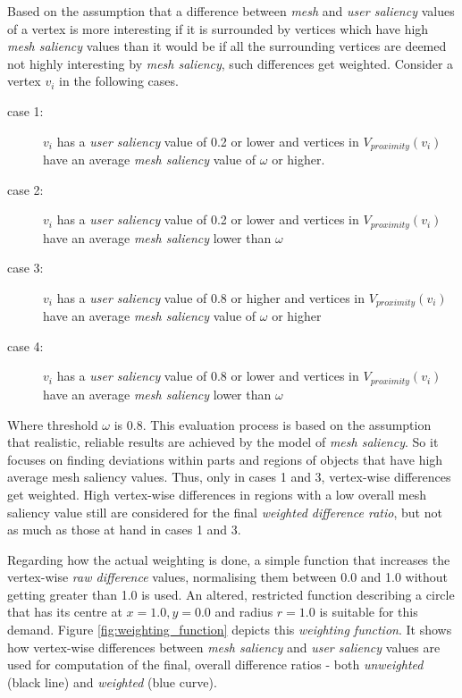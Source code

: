 Based on the assumption that a difference between \textit{mesh} and \textit{user saliency} values of a vertex is more interesting if it is surrounded by vertices which have high \textit{mesh saliency} values than it would be if all the surrounding vertices are deemed not highly interesting by \textit{mesh saliency}, such differences get weighted. Consider a vertex $v_i$ in the following cases.

\begin{description}
	\item [case 1:] $v_i$ has a \textit{user saliency} value of 0.2 or lower and vertices in $V_{proximity}(v_i)$ have an average \textit{mesh saliency} value of $\omega$ or higher.
	\item [case 2:] $v_i$ has a \textit{user saliency} value of 0.2 or lower and vertices in $V_{proximity}(v_i)$ have an average \textit{mesh saliency} lower than $\omega$
	\item [case 3:] $v_i$ has a \textit{user saliency} value of 0.8 or higher and vertices in $V_{proximity}(v_i)$ have an average \textit{mesh saliency} value of $\omega$ or higher
	\item [case 4:] $v_i$ has a \textit{user saliency} value of 0.8 or lower and vertices in $V_{proximity}(v_i)$ have an average \textit{mesh saliency} lower than $\omega$
\end{description}

Where threshold $\omega$ is 0.8. This evaluation process is based on the assumption that realistic, reliable results are achieved by the model of \textit{mesh saliency}. So it focuses on finding deviations within parts and regions of objects that have high average mesh saliency values. Thus, only in cases 1 and 3, vertex-wise differences get weighted. High vertex-wise differences in regions with a low overall mesh saliency value still are considered for the final \textit{weighted difference ratio}, but not as much as those at hand in cases 1 and 3.

Regarding how the actual weighting is done, a simple function that increases the vertex-wise \textit{raw difference} values, normalising them between 0.0 and 1.0 without getting greater than 1.0 is used. An altered, restricted function describing a circle that has its centre at $x = 1.0, y = 0.0$ and radius $r = 1.0$ is suitable for this demand. Figure \ref{fig:weighting_function} depicts this \textit{weighting function}. It shows how vertex-wise differences between \textit{mesh saliency} and \textit{user saliency} values are used for computation of the final, overall difference ratios - both \textit{unweighted} (black line) and \textit{weighted} (blue curve).

